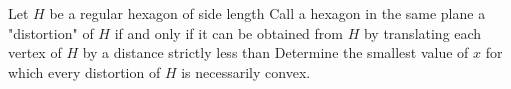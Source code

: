 Let $H$ be a regular hexagon of side length  Call a hexagon in the same plane a "distortion" of $H$ if
and only if it can be obtained from $H$ by translating each vertex of $H$ by a distance strictly less than  Determine the smallest value of $x$ for which every distortion of $H$ is necessarily convex.